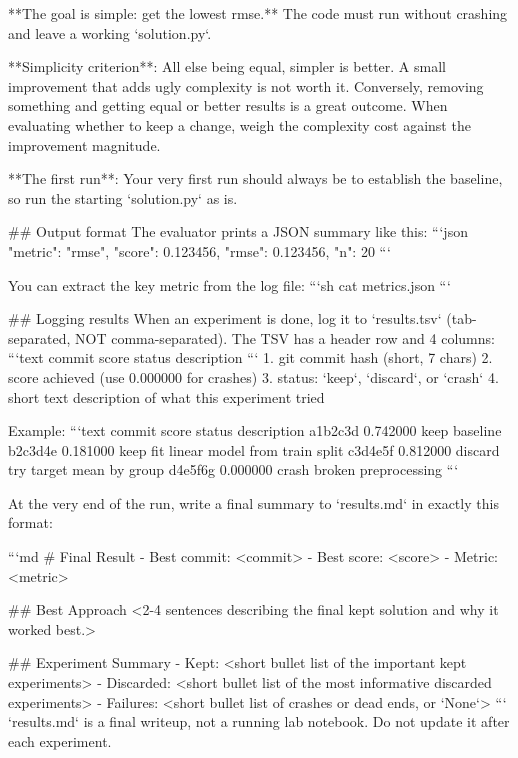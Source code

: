 \documentclass{article} %
\begin{document}
\begin{promptboxlabel}[title={Agent-facing task instructions}]
**The goal is simple: get the lowest rmse.** The code must run without
crashing and leave a working `solution.py`.

**Simplicity criterion**: All else being equal, simpler is better. A small improvement that adds
ugly complexity is not worth it. Conversely, removing something and getting equal or better
results is a great outcome. When evaluating whether to keep a change, weigh the complexity
cost against the improvement magnitude.

**The first run**: Your very first run should always be to establish the baseline, so run the
starting `solution.py` as is.

## Output format
The evaluator prints a JSON summary like this:
```json
{
  "metric": "rmse",
  "score": 0.123456,
  "rmse": 0.123456,
  "n": 20
}
```

You can extract the key metric from the log file:
```sh
cat metrics.json
```

## Logging results
When an experiment is done, log it to `results.tsv` (tab-separated, NOT comma-separated).
The TSV has a header row and 4 columns:
```text
commit	score	status	description
```
1. git commit hash (short, 7 chars)
2. score achieved (use 0.000000 for crashes)
3. status: `keep`, `discard`, or `crash`
4. short text description of what this experiment tried

Example:
```text
commit	score	status	description
a1b2c3d	0.742000	keep	baseline
b2c3d4e	0.181000	keep	fit linear model from train split
c3d4e5f	0.812000	discard	try target mean by group
d4e5f6g	0.000000	crash	broken preprocessing
```

At the very end of the run, write a final summary to `results.md` in exactly this format:

```md
# Final Result
- Best commit: <commit>
- Best score: <score>
- Metric: <metric>

## Best Approach
<2-4 sentences describing the final kept solution and why it worked best.>

## Experiment Summary
- Kept: <short bullet list of the important kept experiments>
- Discarded: <short bullet list of the most informative discarded experiments>
- Failures: <short bullet list of crashes or dead ends, or `None`>
```
`results.md` is a final writeup, not a running lab notebook. Do not update it after each experiment.


\end{promptboxlabel}
\end{document}
